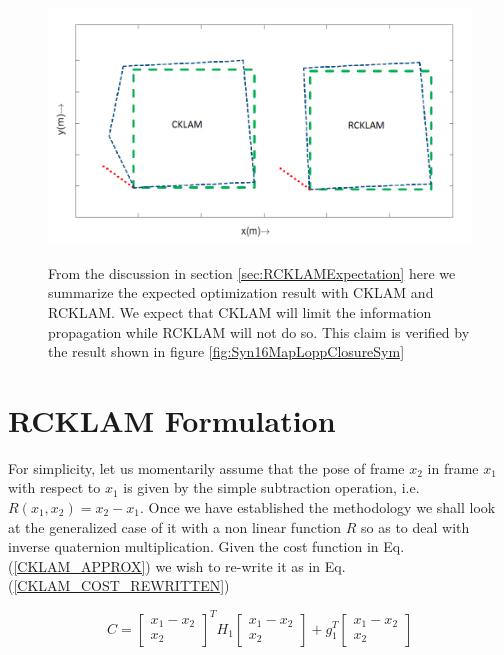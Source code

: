 \begin{figure}
	\centering
		\includegraphics[width=1.00\textwidth]{images/hypotheticalLoopClosureCklamRcklam.png}
	\label{fig:hypotheticalLoopClosureCklamRcklam}
  \caption{From the discussion in section \ref{sec:RCKLAMExpectation} here we summarize the expected optimization result with CKLAM and RCKLAM. We expect that CKLAM will limit the information propagation while RCKLAM will not do so. This claim is verified by the result shown in figure \ref{fig:Syn16MapLoppClosureSym}}
\end{figure}

 

\section{RCKLAM Formulation}
\label{rcklamSimple}
For simplicity, let us momentarily assume that the pose of frame $x_2$ in frame $x_1$ with respect to $x_1$ is given by the simple  subtraction operation, i.e. $R(x_1, x_2) = x_2 - x_1$. Once we have established the methodology we shall look at the generalized case of it with a non linear function $R$ so as to deal with inverse quaternion multiplication. Given the cost function in Eq.(\ref{CKLAM_APPROX}) we wish to re-write it as in Eq.(\ref{CKLAM_COST_REWRITTEN})

\begin{equation}
	C = \begin{bmatrix} x_1-x_2 \\ x_2 \end{bmatrix} ^TH_1\begin{bmatrix} x_1-x_2 \\ x_2 \end{bmatrix} + g_1^T\begin{bmatrix} x_1-x_2 \\ x_2 \end{bmatrix}
	\label{CKLAM_COST_REWRITTEN}
\end{equation}


